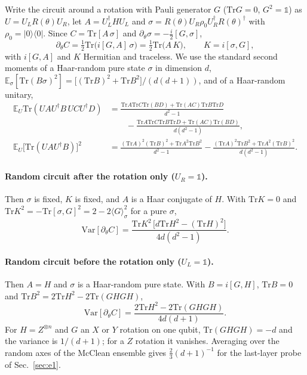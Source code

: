 \documentclass[11pt]{article}
\newcommand{\Var}{\mathrm{Var}}
\newcommand{\Tr}{\mathrm{Tr}}
\newcommand{\E}{\mathbb{E}}
\begin{document}
Write the circuit around a rotation with Pauli generator $G$ ($\Tr G=0$, $G^2=\mathbb 1$) as $U=U_LR(\theta)U_R$, let $A=U_L^\dagger HU_L$ and $\sigma=R(\theta)U_R\rho_0U_R^\dagger R(\theta)^\dagger$ with $\rho_0=|0\rangle\langle0|$. Since $C=\Tr[A\,\sigma]$ and $\partial_\theta\sigma=-\tfrac i2[G,\sigma]$,
\begin{equation}
  \partial_\theta C=\tfrac12\Tr\big(i[G,A]\,\sigma\big)=\tfrac12\Tr\big(A\,K\big),\qquad K=i[\sigma,G],
\end{equation}
with $i[G,A]$ and $K$ Hermitian and traceless. We use the standard second moments of a Haar-random pure state $\sigma$ in dimension $d$, $\E_\sigma[\Tr(B\sigma)^2]=\big[(\Tr B)^2+\Tr B^2\big]/(d(d+1))$, and of a Haar-random unitary,
\begin{align}
\E_U\Tr(UAU^\dagger B\,UCU^\dagger D)&=\frac{\Tr A\Tr C\Tr(BD)+\Tr(AC)\Tr B\Tr D}{d^2-1}\nonumber\\
&\qquad-\frac{\Tr A\Tr C\Tr B\Tr D+\Tr(AC)\Tr(BD)}{d(d^2-1)},\\
\E_U\big[\Tr(UAU^\dagger B)\big]^2&=\frac{(\Tr A)^2(\Tr B)^2+\Tr A^2\Tr B^2}{d^2-1}-\frac{(\Tr A)^2\Tr B^2+\Tr A^2(\Tr B)^2}{d(d^2-1)} .
\end{align}

\paragraph{Random circuit after the rotation only ($U_R=\mathbb 1$).}
Then $\sigma$ is fixed, $K$ is fixed, and $A$ is a Haar conjugate of $H$. With $\Tr K=0$ and $\Tr K^2=-\Tr[\sigma,G]^2=2-2\langle G\rangle_\sigma^2$ for a pure $\sigma$,
\begin{equation}
  \Var[\partial_\theta C]=\frac{\Tr K^2\,\big[d\Tr H^2-(\Tr H)^2\big]}{4d(d^2-1)} .
  \label{eq:haarL}
\end{equation}

\paragraph{Random circuit before the rotation only ($U_L=\mathbb 1$).}
Then $A=H$ and $\sigma$ is a Haar-random pure state. With $B=i[G,H]$, $\Tr B=0$ and $\Tr B^2=2\Tr H^2-2\Tr(GHGH)$,
\begin{equation}
  \Var[\partial_\theta C]=\frac{2\Tr H^2-2\Tr(GHGH)}{4d(d+1)} .
  \label{eq:haarR}
\end{equation}
For $H=Z^{\otimes n}$ and $G$ an $X$ or $Y$ rotation on one qubit, $\Tr(GHGH)=-d$ and the variance is $1/(d+1)$; for a $Z$ rotation it vanishes. Averaging over the random axes of the McClean ensemble gives $\tfrac23(d+1)^{-1}$ for the last-layer probe of Sec.~\ref{sec:e1}.
\end{document}
